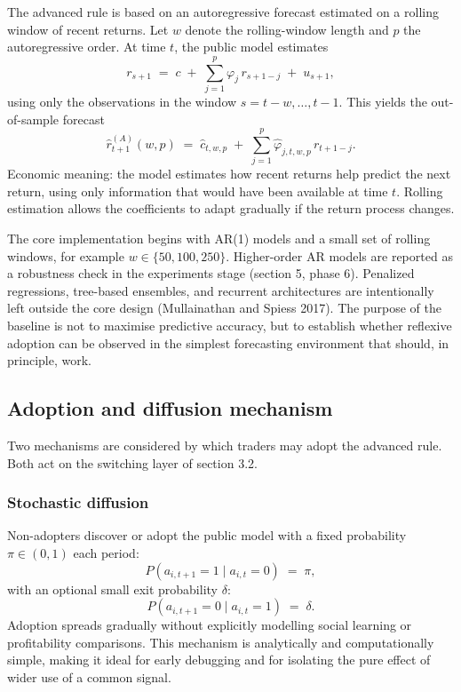 \documentclass[11pt]{article}
\begin{document}
The advanced rule is based on an autoregressive forecast estimated on a rolling window of recent returns. Let $w$ denote the rolling-window length and $p$ the autoregressive order. At time $t$, the public model estimates
\begin{equation}
  r_{s+1} \;=\; c \;+\; \sum_{j=1}^{p} \varphi_{j}\, r_{s+1-j} \;+\; u_{s+1},
\end{equation}
using only the observations in the window $s = t - w, \ldots, t - 1$. This yields the out-of-sample forecast
\begin{equation}
  \hat{r}_{t+1}^{(A)}(w, p) \;=\; \hat{c}_{t, w, p} \;+\; \sum_{j=1}^{p} \hat{\varphi}_{j, t, w, p}\, r_{t+1-j}.
\end{equation}
Economic meaning: the model estimates how recent returns help predict the next return, using only information that would have been available at time $t$. Rolling estimation allows the coefficients to adapt gradually if the return process changes.

The core implementation begins with AR(1) models and a small set of rolling windows, for example $w \in \{50, 100, 250\}$. Higher-order AR models are reported as a robustness check in the experiments stage (section 5, phase 6). Penalized regressions, tree-based ensembles, and recurrent architectures are intentionally left outside the core design (Mullainathan and Spiess 2017). The purpose of the baseline is not to maximise predictive accuracy, but to establish whether reflexive adoption can be observed in the simplest forecasting environment that should, in principle, work.

\subsection{Adoption and diffusion mechanism}

Two mechanisms are considered by which traders may adopt the advanced rule. Both act on the switching layer of section 3.2.

\subsubsection{Stochastic diffusion}

Non-adopters discover or adopt the public model with a fixed probability $\pi \in (0, 1)$ each period:
\begin{equation}
  P(a_{i,t+1} = 1 \mid a_{i,t} = 0) \;=\; \pi,
\end{equation}
with an optional small exit probability $\delta$:
\begin{equation}
  P(a_{i,t+1} = 0 \mid a_{i,t} = 1) \;=\; \delta.
\end{equation}
Adoption spreads gradually without explicitly modelling social learning or profitability comparisons. This mechanism is analytically and computationally simple, making it ideal for early debugging and for isolating the pure effect of wider use of a common signal.
\end{document}
